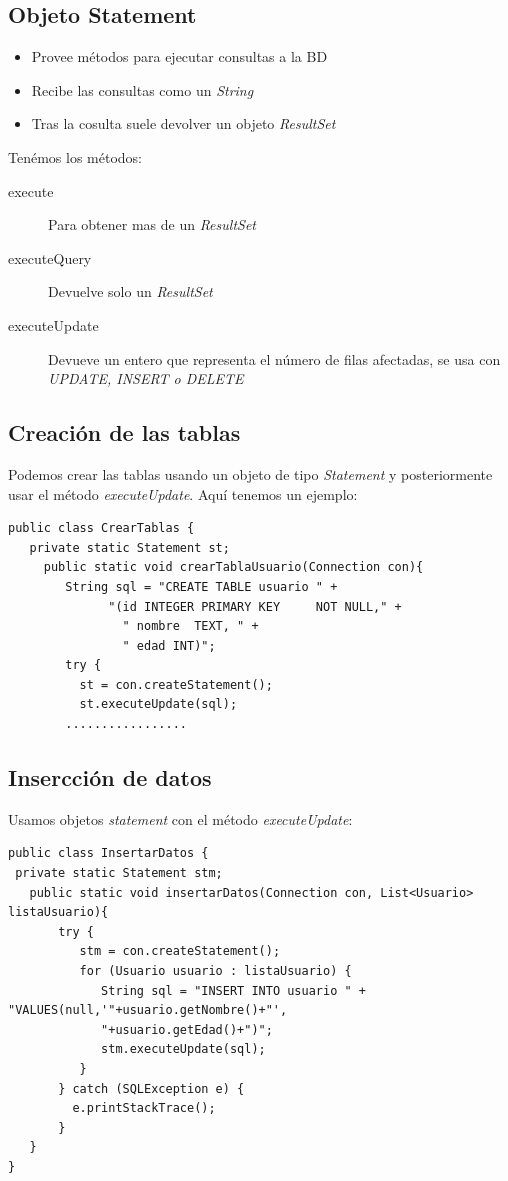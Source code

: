 \documentclass[4paper]{article}
\begin{document}
\newpage
\subsection{Objeto Statement}
\begin{itemize}
\item Provee métodos para ejecutar consultas a la BD
\item Recibe las consultas como un \emph{String}
\item Tras la cosulta suele devolver un objeto \emph{ResultSet}
\end{itemize}
Tenémos los métodos:
\begin{description}
\item[execute] Para obtener mas de un \emph{ResultSet}
\item[executeQuery] Devuelve solo un \emph{ResultSet}
\item[executeUpdate] Devueve un entero que representa el número de filas afectadas, se usa con \emph{UPDATE, INSERT o DELETE}
\end{description}
\subsection{Creación de las tablas}
Podemos crear las tablas usando un objeto de tipo \emph{Statement} y posteriormente usar el método \emph{executeUpdate}. Aquí tenemos un ejemplo:
\begin{lstlisting}
public class CrearTablas {
   private static Statement st;
     public static void crearTablaUsuario(Connection con){
        String sql = "CREATE TABLE usuario " +
              "(id INTEGER PRIMARY KEY     NOT NULL," +
                " nombre  TEXT, " + 
                " edad INT)"; 
        try {
          st = con.createStatement();
          st.executeUpdate(sql);
		.................
\end{lstlisting}
\subsection{Insercción de datos}
Usamos objetos \emph{statement} con el método \emph{executeUpdate}:
\begin{lstlisting}
public class InsertarDatos {
 private static Statement stm;
   public static void insertarDatos(Connection con, List<Usuario> listaUsuario){
       try {
          stm = con.createStatement();
          for (Usuario usuario : listaUsuario) {
             String sql = "INSERT INTO usuario " +  "VALUES(null,'"+usuario.getNombre()+"',
             "+usuario.getEdad()+")";
             stm.executeUpdate(sql);
          }
       } catch (SQLException e) {
         e.printStackTrace();
       }
   }
}
\end{lstlisting}
\newpage
\end{document}
